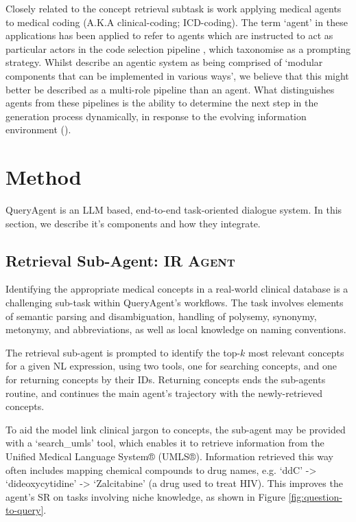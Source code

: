 \documentclass[11pt]{article}
\begin{document}
Closely related to the concept retrieval subtask is work applying medical agents to medical coding (A.K.A clinical-coding; ICD-coding). The term `agent' in these applications has been applied to refer to agents which are instructed to act as particular actors in the code selection pipeline \cite{li_exploring_2024,motzfeldt_code_2025}, which \cite{schulhoff_prompt_2024} taxonomise as a prompting strategy.
Whilst \citet{motzfeldt_code_2025} describe an agentic system as being comprised of `modular components that can be implemented in various ways', we believe that this might better be described as a multi-role pipeline than an agent.
What distinguishes agents from these pipelines is the ability to determine the next step in the generation process dynamically, in response to the evolving information environment (\citet{zhang_agentic_2025}).

\section{Method}

QueryAgent is an LLM based, end-to-end task-oriented dialogue system.
In this section, we describe it's components and how they integrate.

\subsection{Retrieval Sub-Agent: \textsc{IR Agent}}
Identifying the appropriate medical concepts in a real-world clinical database is a challenging sub-task within QueryAgent's workflows.
The task involves elements of semantic parsing and disambiguation, handling of polysemy, synonymy, metonymy, and abbreviations, as well as local knowledge on naming conventions.

The retrieval sub-agent is prompted to identify the top-$k$ most relevant concepts for a given NL expression, using two tools, one for searching concepts, and one for returning concepts by their IDs.
Returning concepts ends the sub-agents routine, and continues the main agent's trajectory with the newly-retrieved concepts.

To aid the model link clinical jargon to concepts,  the sub-agent may be provided with a `search\_umls' tool, which enables it to retrieve information from the Unified Medical Language System® (UMLS®).
Information retrieved this way often includes mapping chemical compounds to drug names, e.g. `ddC' -> `dideoxycytidine' -> `Zalcitabine' (a drug used to treat HIV).
This improves the agent's SR on tasks involving niche knowledge, as shown in Figure \ref{fig:question-to-query}.
\end{document}
